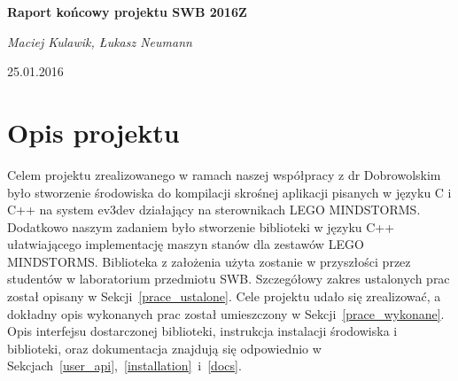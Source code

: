 \documentclass{article}
\begin{document}
\begingroup
    \centering
    \LARGE\textbf{Raport końcowy projektu SWB 2016Z}\\[0.75em]
    \vspace{0.2cm}
    {\large\itshape Maciej Kulawik, Łukasz Neumann\par}
    \vspace{0.5cm}
    {\large 25.01.2016\par}
\endgroup

\section{Opis projektu}
Celem projektu zrealizowanego w ramach naszej współpracy z dr Dobrowolskim było
stworzenie środowiska do kompilacji skrośnej aplikacji pisanych w języku C i C++
na system ev3dev działający na sterownikach LEGO MINDSTORMS. Dodatkowo naszym
zadaniem było stworzenie biblioteki w języku C++ ułatwiającego implementację maszyn
stanów dla zestawów LEGO MINDSTORMS. Biblioteka z założenia użyta zostanie w
przyszłości przez studentów w laboratorium przedmiotu SWB. Szczegółowy zakres
ustalonych prac został opisany w Sekcji~\ref{prace_ustalone}. Cele projektu udało
się zrealizować, a dokładny opis wykonanych prac został umieszczony w
Sekcji~\ref{prace_wykonane}. Opis interfejsu dostarczonej biblioteki,
instrukcja instalacji środowiska i biblioteki, oraz dokumentacja znajdują się odpowiednio w
Sekcjach~\ref{user_api},~\ref{installation}~i~\ref{docs}.
\end{document}
